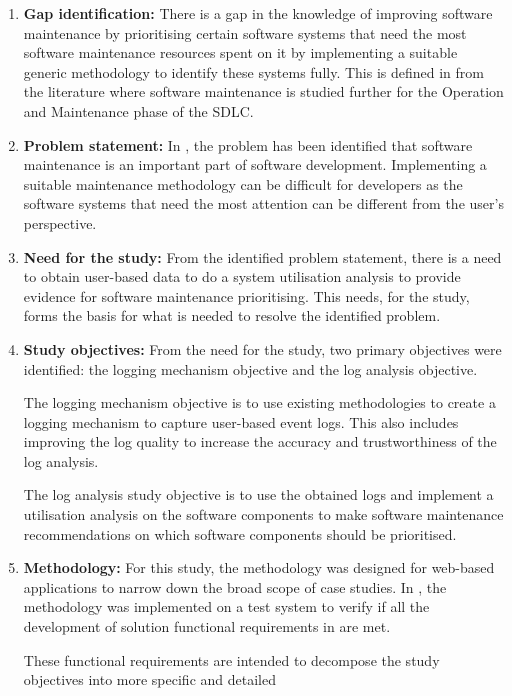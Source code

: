 \begin{enumerate}[label=\textbf{\Roman*.}]	
	\item \textbf{Gap identification:} There is a gap in the knowledge of improving software
	maintenance by prioritising certain software systems that need the most software maintenance
	resources spent on it by implementing a suitable generic methodology to identify these systems
	fully. This is defined in  from the literature where software maintenance is
	studied further for the Operation and Maintenance phase of the SDLC.
	\item \textbf{Problem statement:} In , the problem has been
	identified that software maintenance is an important part of software development. Implementing
	a suitable maintenance methodology can be difficult for developers as the software systems that
	need the most attention can be different from the user's perspective.  
	\item \textbf{Need for the study:} From the identified problem statement, there is a need to
	obtain user-based data to do a system utilisation analysis to provide evidence for software
	maintenance prioritising. This needs, for the study, forms the basis for what is needed to
	resolve the identified problem.
	\item \textbf{Study objectives:} From the need for the study, two primary objectives were
	identified: the logging mechanism objective and the log analysis objective.\par The logging
	mechanism objective is to use existing methodologies to create a logging mechanism to capture
	user-based event logs. This also includes improving the log quality to increase the accuracy and
	trustworthiness of the log analysis.\par The log analysis study objective is to use the obtained
	logs and implement a utilisation analysis on the software components to make software
	maintenance recommendations on which software components should be prioritised.
	\item \textbf{Methodology:} For this study, the methodology was designed for web-based
	applications to narrow down the broad scope of case studies. In , the methodology
	was implemented on a test system to verify if all the development of solution functional
	requirements in  are met.\par These functional
	requirements are intended to decompose the study objectives into more specific and detailed

\end{enumerate}
